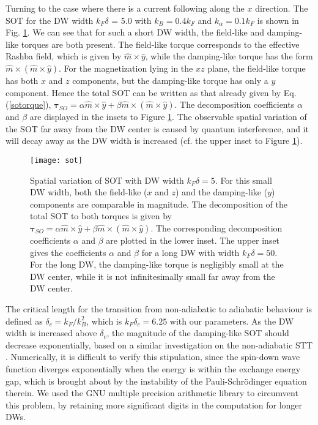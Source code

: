 \documentclass[12pt]{iopart}
\begin{document}
Turning to the case where there is a current following along the $x$ direction. The SOT for the DW width $k_F \delta$ = 5.0 with $k_B = 0.4 k_F$ and $k_\alpha = 0.1 k_F$ is shown in Fig. \ref{sot}. We can see that for such a short DW width, the field-like and damping-like torques are both present. The field-like torque corresponds to the effective Rashba field, which is given by $\hat {m} \times \hat{y}$, while the damping-like torque has the form $\hat {m} \times (\hat {m} \times \hat{y})$. \cite{Manchon} For the magnetization lying in the $xz$ plane, the field-like torque has both $x$ and $z$ components, but the damping-like torque has only a $y$ component. Hence the total SOT can be written as that already given by Eq. (\ref{sotorque}), $\bm {\tau}_{SO} = \alpha \hat {m} \times \hat{y} + \beta \hat {m} \times (\hat {m} \times \hat{y})$. The decomposition coefficients $\alpha$ and $\beta$ are displayed in the insets to Figure \ref{sot}. The observable spatial variation of the SOT far away from the DW center is caused by quantum interference, and it will decay away as the DW width is increased (cf. the upper inset to Figure \ref{sot}).
\begin{figure}\centering
\begin{minipage}[c]{0.5\linewidth}
\texttt{[image: sot]}
\end{minipage}
\caption{Spatial variation of SOT with DW width $k_F\delta = 5$. For this small DW width, both the field-like ($x$ and $z$) and the damping-like ($y$) components are comparable in magnitude. The decomposition of the total SOT to both torques is given by $\bm {\tau}_{SO} = \alpha \hat {m} \times \hat{y} + \beta \hat {m} \times (\hat {m} \times \hat{y})$. The corresponding decomposition coefficients $\alpha$ and $\beta$ are plotted in the lower inset. The upper inset gives the coefficients $\alpha$ and $\beta$ for a long DW with width $k_F\delta = 50$. For the long DW, the damping-like torque is negligibly small at the DW center, while it is not infinitesimally small far away from the DW center.}
\label{sot}
\end{figure}

The critical length for the transition from non-adiabatic to adiabatic behaviour is defined as $\delta_c = k_F/k_B^2$,\cite{Xiao06} which is $k_F \delta_c = 6.25$ with our parameters. As the DW width is increased above $\delta_c$, the magnitude of the damping-like SOT should decrease exponentially, based on a similar investigation on the non-adiabatic STT \cite{Xiao06}. Numerically, it is difficult to verify this stipulation, since the spin-down wave function diverges exponentially when the energy is within the exchange energy gap, which is brought about by the instability of the Pauli-Schr\"{o}dinger equation therein. We used the GNU multiple precision arithmetic library \cite{GMP} to circumvent this problem, by retaining more significant digits in the computation for longer DWs.
\end{document}
